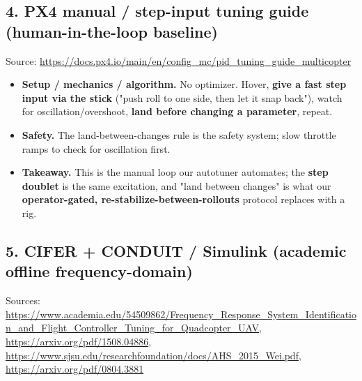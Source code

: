 \documentclass[
  11pt,
]{article}
\providecommand{\tightlist}{%
  \setlength{\itemsep}{0pt}\setlength{\parskip}{0pt}}
\begin{document}
\hypertarget{4-px4-manual--step-input-tuning-guide-human-in-the-loop-baseline}{%
\subsection{4. PX4 manual / step-input tuning guide (human-in-the-loop
baseline)}\label{4-px4-manual--step-input-tuning-guide-human-in-the-loop-baseline}}

Source:
\url{https://docs.px4.io/main/en/config_mc/pid_tuning_guide_multicopter}

\begin{itemize}
\tightlist
\item
  \textbf{Setup / mechanics / algorithm.} No optimizer. Hover,
  \textbf{give a fast step input via the stick} ("push roll to one side,
  then let it snap back"), watch for oscillation/overshoot, \textbf{land
  before changing a parameter}, repeat.
\item
  \textbf{Safety.} The land-between-changes rule is the safety system;
  slow throttle ramps to check for oscillation first.
\item
  \textbf{Takeaway.} This is the manual loop our autotuner automates;
  the \textbf{step doublet} is the same excitation, and "land between
  changes" is what our \textbf{operator-gated,
  re-stabilize-between-rollouts} protocol replaces with a rig.
\end{itemize}

\hypertarget{5-cifer--conduit--simulink-academic-offline-frequency-domain}{%
\subsection{5. CIFER + CONDUIT / Simulink (academic offline
frequency-domain)}\label{5-cifer--conduit--simulink-academic-offline-frequency-domain}}

Sources:
\url{https://www.academia.edu/54509862/Frequency_Response_System_Identification_and_Flight_Controller_Tuning_for_Quadcopter_UAV},
\url{https://arxiv.org/pdf/1508.04886},
\url{https://www.sjsu.edu/researchfoundation/docs/AHS_2015_Wei.pdf},
\url{https://arxiv.org/pdf/0804.3881}
\end{document}
